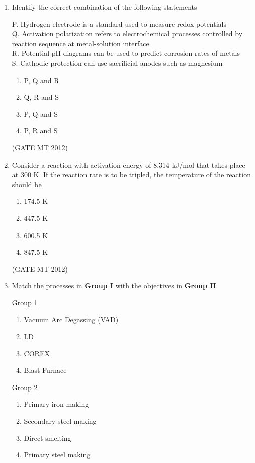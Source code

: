 \documentclass[journal, 11pt, onecolumn]{IEEEtran}
\theoremstyle{remark}
\begin{document}
\begin{enumerate}
\item Identify the correct combination of the following statements

P. Hydrogen electrode is a standard used to measure redox potentials \\
Q. Activation polarization refers to electrochemical processes controlled by reaction sequence at metal-solution interface \\
R. Potential-pH diagrams can be used to predict corrosion rates of metals \\
S. Cathodic protection can use sacrificial anodes such as magnesium

\begin{multicols}{2}
\begin{enumerate}  
\item P, Q and R
\item Q, R and S
\item P, Q and S
\item P, R and S
\end{enumerate}
\end{multicols}
\hfill(GATE MT 2012)

\item Consider a reaction with activation energy of 8.314 kJ/mol that takes place at 300 K. If the reaction rate is to be tripled, the temperature of the reaction should be

\begin{multicols}{2}
\begin{enumerate}  
\item 174.5 K
\item 447.5 K
\item 600.5 K
\item 847.5 K
\end{enumerate}
\end{multicols}
\hfill(GATE MT 2012)

\item Match the processes in \textbf{Group I} with the objectives in \textbf{Group II}
\begin{multicols}{2}
\underline{Group 1}
\begin{enumerate}[label=(\Alph*), start=16]
\item Vacuum Arc Degassing (VAD)  
\item LD
\item COREX 
\item Blast Furnace
\end{enumerate}

\underline{Group 2}
\begin{enumerate}[label=(\arabic*), start=1]
\item Primary iron making 
\item Secondary steel making 
\item Direct smelting
\item Primary steel making 
\end{enumerate}
\end{multicols}


\end{enumerate}
\end{document}
